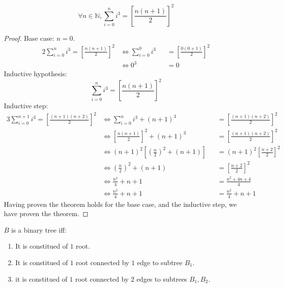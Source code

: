 \documentclass[docid=TP01]{tcom_TP}
\begin{document}
\begin{lemma}
	\begin{equation*}
		\forall n \in \mathbb{N},\sum_{i=0}^{n}{i^3}={\left[\frac{n(n+1)}{2}\right]}^2
	\end{equation*}
\end{lemma}
\begin{proof}
	Base case: $n=0$.
	\begin{alignat*}{2}
		\sum_{i=0}^{n}{i^3}={\left[\frac{n(n+1)}{2}\right]}^2
		&\iff \sum_{i=0}^{0}{i^3} && ={\left[\frac{0(0+1)}{2}\right]}^2 \\
		&\iff 0^3 && =0
	\end{alignat*}
	Inductive hypothesis:
	\begin{equation*}
		\sum_{i=0}^{n}{i^3}={\left[\frac{n(n+1)}{2}\right]}^2
	\end{equation*}
	Inductive step:
	\begin{alignat*}{3}
		\sum_{i=0}^{n+1}{i^3}={\left[\frac{(n+1)(n+2)}{2}\right]}^2
		&\iff \sum_{i=0}^{n}{i^3} +(n+1)^3                               &&= {\left[\frac{(n+1)(n+2)}{2}\right]}^2 \\
		&\iff {\left[\frac{n(n+1)}{2}\right]}^2 +(n+1)^3                 &&= {\left[\frac{(n+1)(n+2)}{2}\right]}^2 \\
		&\iff (n+1)^2 \left[ {\left(\frac{n}{2}\right)}^2 +(n+1) \right] &&= (n+1)^2{\left[\frac{n+2}{2}\right]}^2 \\
		&\iff {\left(\frac{n}{2}\right)}^2 +(n+1)                        &&= {\left[\frac{n+2}{2}\right]}^2 \\
		&\iff \frac{n^2}{4}+n+1                                          &&= \frac{n^2+4n+4}{4} \\
		&\iff \frac{n^2}{4}+n+1                                          &&= \frac{n^2}{4}+n+1
	\end{alignat*}
	Having proven the theorem holds for the base case, and the inductive step, we have proven the theorem.
\end{proof}
\pagebreak
{}
\begin{definition}
\label{def:bt}
	$B$ is a binary tree iff:
	\begin{enumerate}
  		\item \label{itm:bt:1} It is constitued of $1$ root.
  		\item \label{itm:bt:2} It is constitued of $1$ root connected by $1$ edge to  subtree $B_1$.
  		\item \label{itm:bt:3} it is constitued of $1$ root connected by $2$ edges to subtrees $B_1,B_2$.
	\end{enumerate}
\end{definition}
\end{document}
